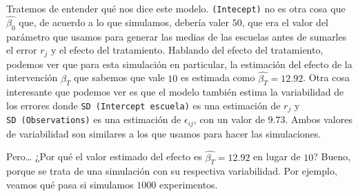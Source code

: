 \documentclass[
  letterpaper,
  DIV=11,
  numbers=noendperiod,
  oneside]{scrreprt}
\begin{document}
Tratemos de entender qué nos dice este modelo. \texttt{(Intecept)} no es
otra cosa que \(\hat{\beta_0}\) que, de acuerdo a lo que simulamos,
debería valer \(50\), que era el valor del parámetro que usamos para
generar las medias de las escuelas antes de sumarles el error \(r_j\) y
el efecto del tratamiento. Hablando del efecto del tratamiento, podemos
ver que para esta simulación en particular, la estimación del efecto de
la intervención \(\beta_T\) que sabemos que vale \(10\) es estimada como
\(\hat{\beta_T} = 12.92\). Otra cosa interesante que podemos ver es que
el modelo también estima la variabilidad de los errores donde
\texttt{SD\ (Intercept\ escuela)} es una estimación de \(r_j\) y
\texttt{SD\ (Observations)} es una estimación de \(\epsilon_{ij}\), con
un valor de \(9.73\). Ambos valores de variabilidad son similares a los
que usamos para hacer las simulaciones.

Pero\ldots{} ¿Por qué el valor estimado del efecto es
\(\hat{\beta_T} = 12.92\) en lugar de \(10\)? Bueno, porque se trata de
una simulación con su respectiva variabilidad. Por ejemplo, veamos qué
pasa si simulamos \(1000\) experimentos.
\end{document}
